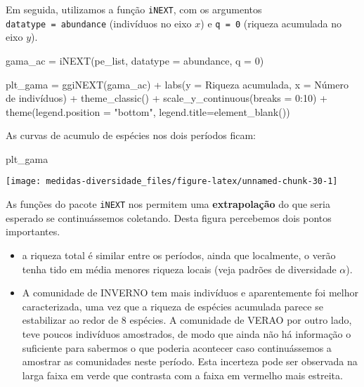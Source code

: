 \documentclass[
]{book}
\newenvironment{Shaded}{\begin{snugshade}}{\end{snugshade}}
\newcommand{\AttributeTok}[1]{\textcolor[rgb]{0.77,0.63,0.00}{#1}}
\newcommand{\DecValTok}[1]{\textcolor[rgb]{0.00,0.00,0.81}{#1}}
\newcommand{\FunctionTok}[1]{\textcolor[rgb]{0.00,0.00,0.00}{#1}}
\newcommand{\NormalTok}[1]{#1}
\newcommand{\OtherTok}[1]{\textcolor[rgb]{0.56,0.35,0.01}{#1}}
\newcommand{\SpecialCharTok}[1]{\textcolor[rgb]{0.00,0.00,0.00}{#1}}
\newcommand{\StringTok}[1]{\textcolor[rgb]{0.31,0.60,0.02}{#1}}
\begin{document}
Em seguida, utilizamos a função \texttt{iNEXT}, com os argumentos \texttt{datatype\ =\ \textquotesingle{}abundance\textquotesingle{}} (indivíduos no eixo \(x\)) e \texttt{q\ =\ 0} (riqueza acumulada no eixo \(y\)).

\begin{Shaded}
\begin{Highlighting}[]
\NormalTok{gama\_ac }\OtherTok{=} \FunctionTok{iNEXT}\NormalTok{(pe\_list, }
                 \AttributeTok{datatype =} \StringTok{\textquotesingle{}abundance\textquotesingle{}}\NormalTok{, }
                 \AttributeTok{q =} \DecValTok{0}\NormalTok{)}

\NormalTok{plt\_gama }\OtherTok{=} \FunctionTok{ggiNEXT}\NormalTok{(gama\_ac) }\SpecialCharTok{+}
  \FunctionTok{labs}\NormalTok{(}\AttributeTok{y =} \StringTok{\textquotesingle{}Riqueza acumulada\textquotesingle{}}\NormalTok{,}
       \AttributeTok{x =} \StringTok{\textquotesingle{}Número de indivíduos\textquotesingle{}}\NormalTok{) }\SpecialCharTok{+}
  \FunctionTok{theme\_classic}\NormalTok{() }\SpecialCharTok{+}
  \FunctionTok{scale\_y\_continuous}\NormalTok{(}\AttributeTok{breaks =} \DecValTok{0}\SpecialCharTok{:}\DecValTok{10}\NormalTok{) }\SpecialCharTok{+}
  \FunctionTok{theme}\NormalTok{(}\AttributeTok{legend.position =} \StringTok{"bottom"}\NormalTok{, }
        \AttributeTok{legend.title=}\FunctionTok{element\_blank}\NormalTok{())}
\end{Highlighting}
\end{Shaded}

As curvas de acumulo de espécies nos dois períodos ficam:

\begin{Shaded}
\begin{Highlighting}[]
\NormalTok{plt\_gama}
\end{Highlighting}
\end{Shaded}

\begin{center}\texttt{[image: medidas-diversidade\_files/figure-latex/unnamed-chunk-30-1]} \end{center}

As funções do pacote \texttt{iNEXT} nos permitem uma \textbf{extrapolação} do que seria esperado se continuássemos coletando. Desta figura percebemos dois pontos importantes.

\begin{itemize}
\item
  a riqueza total é similar entre os períodos, ainda que localmente, o verão tenha tido em média menores riqueza locais (veja padrões de diversidade \(\alpha\)).
\item
  A comunidade de INVERNO tem mais indivíduos e aparentemente foi melhor caracterizada, uma vez que a riqueza de espécies acumulada parece se estabilizar ao redor de 8 espécies. A comunidade de VERAO por outro lado, teve poucos indivíduos amostrados, de modo que ainda não há informação o suficiente para sabermos o que poderia acontecer caso continuássemos a amostrar as comunidades neste período. Esta incerteza pode ser observada na larga faixa em verde que contrasta com a faixa em vermelho mais estreita.
\end{itemize}
\end{document}
